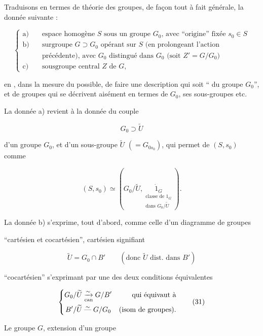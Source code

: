 
 Traduisons en termes de théorie des groupes, de façon tout à fait générale, la donnée suivante :

\[
\left\{\begin{aligned}
\text{a)}\quad&\text{espace homogène $S$ sous un groupe $G_0$, avec ``origine'' fixée $s_0\in S$}\\
\text{b)}\quad&\text{surgroupe $G\supset G_0$ opérant sur $S$ (en prolongeant l'action}\\
 &\text{précédente), avec $G_0$ distingué dans $G_0$ (soit $Z'=G/G_0$)}\\
\text{c)}\quad&\text{sousgroupe central $Z$ de $G$,}
\end{aligned}\right.\tag*{(26)}
\]


en , dans la mesure du possible, de faire une description qui soit `` du groupe $G_0$'', et de groupes qui se décrivent aisément en termes de $G_0$,  ses sous-groupes etc.

La donnée a) revient à la donnée du couple

\[ G_0\supset\widetilde U \tag*{(27)} \]

d'un groupe $G_0$, et d'un sous-groupe $\widetilde U$ $(=G_{0s_0})$, qui permet de  $(S,s_0)$ comme

\[ (S,s_0)\simeq(G_0/\widetilde U,\underset{\substack{\text{classe de }1_G\\\text{dans }G_0/\widetilde U}}{\dot{1}_G}). \tag*{(28)} \]

La donnée b) s'exprime, tout d'abord, comme celle d'un diagramme de groupes


``cartésien et cocartésien'', cartésien signifiant

\[ \widetilde U=G_0\cap B'\qquad(\text{donc }\widetilde U\text{ dist. dans }B') \tag*{(30)} \]

``cocartésien'' s'exprimant par une des deux conditions équivalentes

\[
\left\{\begin{aligned}
G_0/\widetilde U&\underset{\rm can}{\xrightarrow{\sim}}G/B' &\text{qui équivaut à}\\
B'/\widetilde U&\mathrel{\overset{\sim}{\text{---}}}G/G_0 &\text{(isom de groupes).}
\end{aligned}\right.\tag*{(31)}
\]

Le groupe $G$, extension d'un groupe

